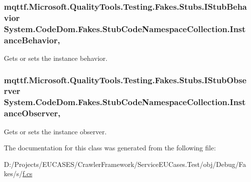 \hypertarget{class_system_1_1_code_dom_1_1_fakes_1_1_stub_code_namespace_collection_a19a5c1f5065a3e086c536ee91b4ebc1b}{
\subsubsection[{Instance\-Behavior}]{\setlength{\rightskip}{0pt plus 5cm}mqttf.\-Microsoft.\-Quality\-Tools.\-Testing.\-Fakes.\-Stubs.\-I\-Stub\-Behavior System.\-Code\-Dom.\-Fakes.\-Stub\-Code\-Namespace\-Collection.\-Instance\-Behavior\hspace{0.3cm}{\ttfamily [get]}, {\ttfamily [set]}}}\label{class_system_1_1_code_dom_1_1_fakes_1_1_stub_code_namespace_collection_a19a5c1f5065a3e086c536ee91b4ebc1b}


Gets or sets the instance behavior.

\hypertarget{class_system_1_1_code_dom_1_1_fakes_1_1_stub_code_namespace_collection_a63eddedd009f9152228e3afd2e8f76be}{
\subsubsection[{Instance\-Observer}]{\setlength{\rightskip}{0pt plus 5cm}mqttf.\-Microsoft.\-Quality\-Tools.\-Testing.\-Fakes.\-Stubs.\-I\-Stub\-Observer System.\-Code\-Dom.\-Fakes.\-Stub\-Code\-Namespace\-Collection.\-Instance\-Observer\hspace{0.3cm}{\ttfamily [get]}, {\ttfamily [set]}}}\label{class_system_1_1_code_dom_1_1_fakes_1_1_stub_code_namespace_collection_a63eddedd009f9152228e3afd2e8f76be}


Gets or sets the instance observer.



The documentation for this class was generated from the following file\-:\begin{DoxyCompactItemize}
\item 
D\-:/\-Projects/\-E\-U\-C\-A\-S\-E\-S/\-Crawler\-Framework/\-Service\-E\-U\-Cases.\-Test/obj/\-Debug/\-Fakes/s/\hyperlink{s_2f_8cs}{f.\-cs}\end{DoxyCompactItemize}
